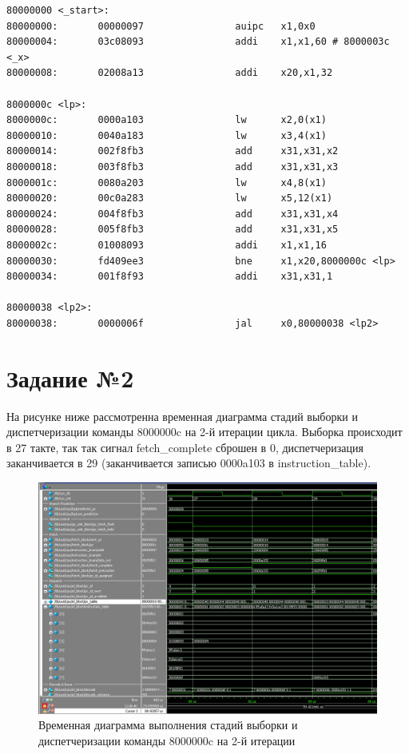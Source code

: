\begin{lstlisting}[label=code, caption=Дизассемблированный листинг рассматриваемой программы]
80000000 <_start>:
80000000:       00000097                auipc   x1,0x0
80000004:       03c08093                addi    x1,x1,60 # 8000003c <_x>
80000008:       02008a13                addi    x20,x1,32

8000000c <lp>:
8000000c:       0000a103                lw      x2,0(x1)
80000010:       0040a183                lw      x3,4(x1)
80000014:       002f8fb3                add     x31,x31,x2
80000018:       003f8fb3                add     x31,x31,x3
8000001c:       0080a203                lw      x4,8(x1)
80000020:       00c0a283                lw      x5,12(x1)
80000024:       004f8fb3                add     x31,x31,x4
80000028:       005f8fb3                add     x31,x31,x5
8000002c:       01008093                addi    x1,x1,16
80000030:       fd409ee3                bne     x1,x20,8000000c <lp>
80000034:       001f8f93                addi    x31,x31,1

80000038 <lp2>:
80000038:       0000006f                jal     x0,80000038 <lp2>
\end{lstlisting}
\captionsetup{singlelinecheck = false, justification=centering}

\chapter{Задание №2}

На рисунке ниже рассмотренна временная диаграмма стадий выборки и диспетчеризации команды 8000000c на 2-й итерации цикла. Выборка происходит в 27 такте, так так сигнал fetch\_complete сброшен в 0, диспетчеризация заканчивается в 29 (заканчивается записью 0000a103 в instruction\_table).

\begin{figure}[h!]
	\begin{center}
		\includegraphics[scale=0.6]{assets/Task2.png}
	\end{center}
	\caption{Временная диаграмма выполнения стадий выборки и диспетчеризации команды 8000000c на 2-й итерации}
\end{figure}

